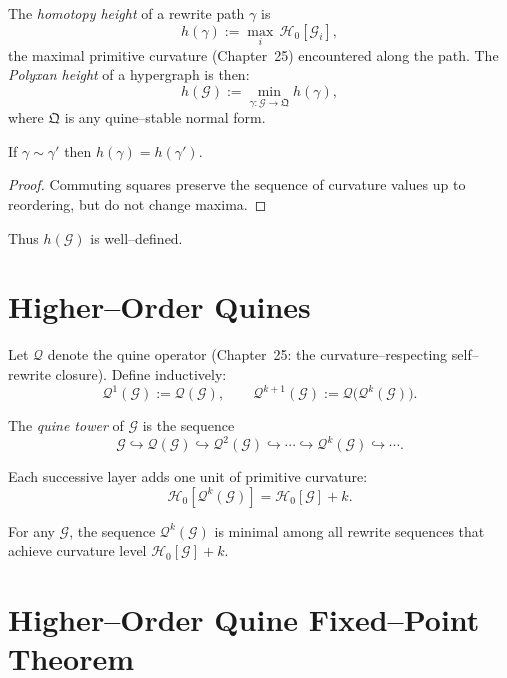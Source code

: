 The \emph{homotopy height} of a rewrite path $\gamma$ is
\[
h(\gamma)
  := \max_i\, \mathcal{H}_0[\mathcal{G}_i],
\]
the maximal primitive curvature (Chapter~25) encountered along the path.
The \emph{Polyxan height} of a hypergraph is then:
\[
h(\mathcal{G}) := \min_{\gamma : \mathcal{G}\to \mathfrak{Q}}
                   h(\gamma),
\]
where $\mathfrak{Q}$ is any quine--stable normal form.

\begin{lemma}
If $\gamma \sim \gamma'$ then $h(\gamma)=h(\gamma')$.
\end{lemma}

\begin{proof}
Commuting squares preserve the sequence of curvature values up to
reordering, but do not change maxima.
\end{proof}

Thus $h(\mathcal{G})$ is well--defined.

\section{Higher--Order Quines}

Let $\mathcal{Q}$ denote the quine operator
(Chapter~25: the curvature--respecting self--rewrite closure).
Define inductively:
\[
\mathcal{Q}^1(\mathcal{G}) := \mathcal{Q}(\mathcal{G}), \qquad
\mathcal{Q}^{k+1}(\mathcal{G}) := \mathcal{Q}\bigl(\mathcal{Q}^k(\mathcal{G})\bigr).
\]

\begin{definition}
The \emph{quine tower} of $\mathcal{G}$ is the sequence
\[
\mathcal{G} \hookrightarrow \mathcal{Q}(\mathcal{G})
              \hookrightarrow \mathcal{Q}^2(\mathcal{G})
              \hookrightarrow \cdots \hookrightarrow
              \mathcal{Q}^k(\mathcal{G}) \hookrightarrow \cdots.
\]
\end{definition}

Each successive layer adds one unit of primitive curvature:
\[
\mathcal{H}_0[\mathcal{Q}^k(\mathcal{G})]
  = \mathcal{H}_0[\mathcal{G}] + k.
\]

\begin{lemma}[Minimality]
For any $\mathcal{G}$, the sequence $\mathcal{Q}^k(\mathcal{G})$
is minimal among all rewrite sequences that achieve curvature level
$\mathcal{H}_0[\mathcal{G}] + k$.
\end{lemma}

\section{Higher--Order Quine Fixed--Point Theorem}

